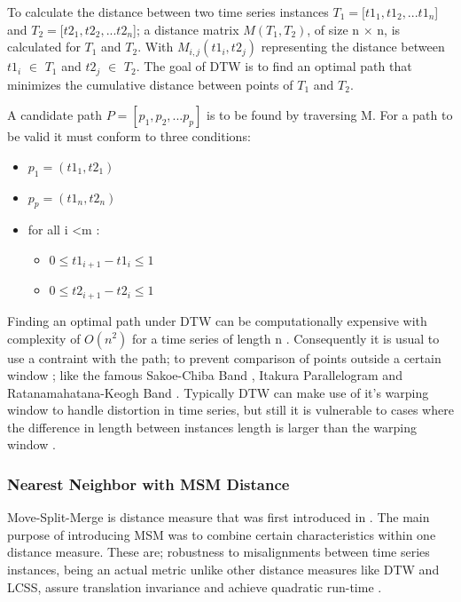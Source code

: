 To calculate the distance between two time series instances  $T_{1} = [t1_{1},t1_{2},...t1_{n}$]
and $T_{2} = [t2_{1},t2_{2},...t2_{n}$];
a distance matrix $M(T_{1},T_{2})$, of size n $\times$ n, is calculated for $T_{1}$ and $T_{2}$.
With $M_{i,j}(t1_{i},t2_{j})$ representing the distance between $t1_{i}$ $\in$ $T_{1}$
and $t2_{j}$ $\in$ $T_{2}$.
The goal of DTW is to find an optimal path that minimizes the cumulative distance between points of $T_{1}$ and $T_{2}$.

A candidate path $P = [p_{1},p_{2},...p_{p}]$ is to be found by traversing M.
For a path to be valid it must conform to three conditions:
\begin{itemize}
    \item $p_{1} = (t1_{1},t2_{1})$
    \item $p_{p} = (t1_{n},t2_{n})$
    \item for all i \textless m :
        \begin{itemize}
            \item $0 \leq t1_{i+1} - t1_{i} \leq 1$
            \item $0 \leq t2_{i+1} - t2_{i} \leq 1$
        \end{itemize}
\end{itemize}

Finding an optimal path under DTW can be computationally expensive with complexity of $O(n^2)$ for a time series of length n \cite{schafer2017fast,petitjean2016faster}.
Consequently it is usual to use a contraint with the path; to prevent comparison of points outside a certain window \cite{tan2020fastee}; like the famous Sakoe-Chiba Band \cite{sakoe1978dynamic}, Itakura Parallelogram \cite{itakura1975minimum} and Ratanamahatana-Keogh Band \cite{ratanamahatana2004making}.
Typically DTW can make use of it's warping window to handle distortion in time series,
but still it is vulnerable to cases where the difference in length between instances length is larger than the warping window \cite{tan2019time}.

\subsubsection{Nearest Neighbor with MSM Distance}
\label{SubsubsectionMSM}
Move-Split-Merge is distance measure that was first introduced in \cite{stefan2012move}.
The main purpose of introducing MSM was to combine certain characteristics within one distance measure.
These are; robustness to misalignments between time series instances, being an actual metric unlike other distance measures like DTW and LCSS,
assure translation invariance and achieve quadratic run-time \cite{lines2015time}.

